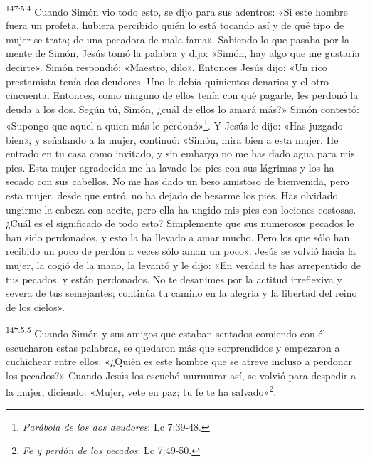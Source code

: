 \par 
\textsuperscript{147:5.4} Cuando Simón vio todo esto, se dijo para sus adentros: «Si este hombre fuera un profeta, hubiera percibido quién lo está tocando así y de qué tipo de mujer se trata; de una pecadora de mala fama». Sabiendo lo que pasaba por la mente de Simón, Jesús tomó la palabra y dijo: «Simón, hay algo que me gustaría decirte». Simón respondió: «Maestro, dilo». Entonces Jesús dijo: «Un rico prestamista tenía dos deudores. Uno le debía quinientos denarios y el otro cincuenta. Entonces, como ninguno de ellos tenía con qué pagarle, les perdonó la deuda a los dos. Según tú, Simón, ¿cuál de ellos lo amará más?» Simón contestó: «Supongo que aquel a quien más le perdonó»\footnote{\textit{Parábola de los dos deudores}: Lc 7:39-48.}. Y Jesús le dijo: «Has juzgado bien», y señalando a la mujer, continuó: «Simón, mira bien a esta mujer. He entrado en tu casa como invitado, y sin embargo no me has dado agua para mis pies. Esta mujer agradecida me ha lavado los pies con sus lágrimas y los ha secado con sus cabellos. No me has dado un beso amistoso de bienvenida, pero esta mujer, desde que entró, no ha dejado de besarme los pies. Has olvidado ungirme la cabeza con aceite, pero ella ha ungido mis pies con lociones costosas. ¿Cuál es el significado de todo esto? Simplemente que sus numerosos pecados le han sido perdonados, y esto la ha llevado a amar mucho. Pero los que sólo han recibido un poco de perdón a veces sólo aman un poco». Jesús se volvió hacia la mujer, la cogió de la mano, la levantó y le dijo: «En verdad te has arrepentido de tus pecados, y están perdonados. No te desanimes por la actitud irreflexiva y severa de tus semejantes; continúa tu camino en la alegría y la libertad del reino de los cielos».

\par 
\textsuperscript{147:5.5} Cuando Simón y sus amigos que estaban sentados comiendo con él escucharon estas palabras, se quedaron más que sorprendidos y empezaron a cuchichear entre ellos: «¿Quién es este hombre que se atreve incluso a perdonar los pecados?» Cuando Jesús los escuchó murmurar así, se volvió para despedir a la mujer, diciendo: «Mujer, vete en paz; tu fe te ha salvado»\footnote{\textit{Fe y perdón de los pecados}: Lc 7:49-50.}.

